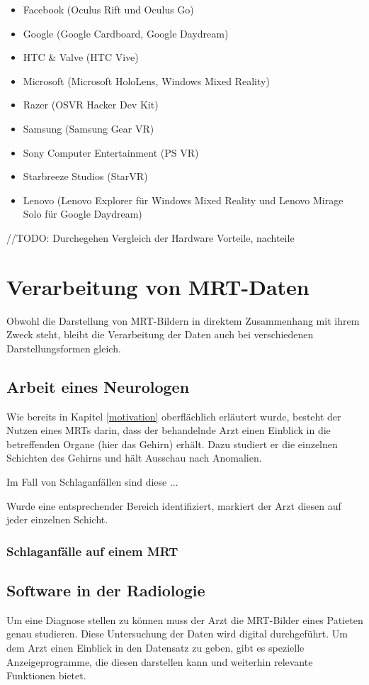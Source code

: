 \begin{itemize}
\item Facebook (Oculus Rift und Oculus Go)
\item Google (Google Cardboard, Google Daydream)
\item HTC \& Valve (HTC Vive)
\item Microsoft (Microsoft HoloLens, Windows Mixed Reality)
\item Razer (OSVR Hacker Dev Kit)
\item Samsung (Samsung Gear VR)
\item Sony Computer Entertainment (PS VR)
\item Starbreeze Studios (StarVR)
\item Lenovo (Lenovo Explorer für Windows Mixed Reality und Lenovo Mirage Solo für Google Daydream)
\end{itemize}

//TODO:
Durchegehen
Vergleich der Hardware Vorteile, nachteile
\section{Verarbeitung von MRT-Daten}						 %
Obwohl die Darstellung von MRT-Bildern in direktem Zusammenhang mit ihrem Zweck steht, bleibt die Verarbeitung der Daten auch bei verschiedenen Darstellungsformen gleich. 

\subsection{Arbeit eines Neurologen}
Wie bereits in Kapitel \ref{motivation} oberflächlich erläutert wurde, besteht der Nutzen eines MRTs darin, dass der behandelnde Arzt einen Einblick in die betreffenden Organe (hier das Gehirn) erhält. Dazu studiert er die einzelnen Schichten des Gehirns und hält Ausschau nach Anomalien.

Im Fall von Schlaganfällen sind diese ...

Wurde eine entsprechender Bereich identifiziert, markiert der Arzt diesen auf jeder einzelnen Schicht. 
\subsubsection{Schlaganfälle auf einem MRT}

\subsection{Software in der Radiologie}
Um eine Diagnose stellen zu können muss der Arzt die MRT-Bilder eines Patieten genau studieren. Diese Untersuchung der Daten wird digital durchgeführt. Um dem Arzt einen Einblick in den Datensatz zu geben, gibt es spezielle Anzeigeprogramme, die diesen darstellen kann und weiterhin relevante Funktionen bietet. 
  
